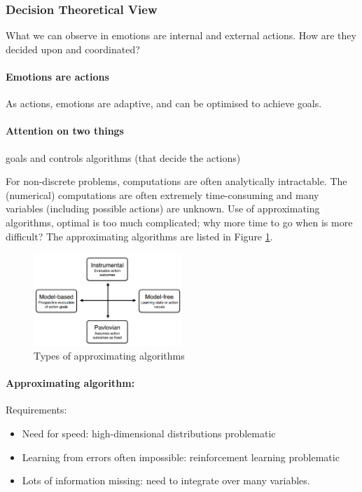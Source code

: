 \documentclass[12pt,article,oneside,a4paper]{memoir}
\begin{document}
\subsubsection{Decision Theoretical View}
What we can observe in emotions are internal and external actions. How are they decided upon and coordinated?

\paragraph{Emotions are actions} As actions, emotions are adaptive, and can be optimised to achieve goals.

\paragraph{Attention on two things} goals and controls algorithms (that decide the actions)

For non-discrete problems, computations are often analytically intractable. The (numerical) computations are often extremely time-consuming and many variables (including possible actions) are unknown. Use of approximating algorithms, optimal is too much complicated; why more time to go when is more difficult? The approximating algorithms are listed in Figure \ref{fig:approximating-algorithms}.

\begin{figure}
  \centering
  \includegraphics[width=0.5\textwidth]{imgs/approximating-algorithms.png}
  \caption{Types of approximating algorithms}
  \label{fig:approximating-algorithms}
\end{figure}

\paragraph{Approximating algorithm: } 
Requirements: 
\begin{itemize}
\item Need for speed: high-dimensional distributions problematic
\item Learning from errors often impossible: reinforcement learning problematic
\item Lots of information missing: need to integrate over many variables.
\end{itemize}
\end{document}
